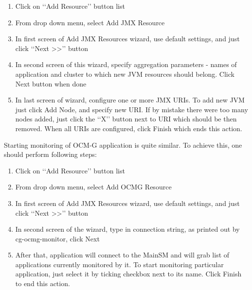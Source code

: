 \begin{enumerate}

\item Click on \lq\lq{}Add Resource\rq\rq{} button list 

\item From drop down menu, select Add JMX Resource

\item In first screen of Add JMX Resources wizard, use default settings, and just click \lq\lq{}Next >>\rq\rq{} button

\item In second screen of this wizard, specify aggregation parameters - names of application and cluster to which new JVM resources should belong. Click Next button when done

\item In last screen of wizard, configure one or more JMX URIs. To add new JVM just click Add Node, and specify new URI. If by mistake there were too many nodes added, just click the \lq\lq{}X\rq\rq{} button next to URI which should be then removed. When all URIs are configured, click Finish which ends this action.

\end{enumerate}

Starting monitoring of OCM-G application is quite similar. To achieve this, one should perform following steps:

\begin{enumerate}

\item Click on \lq\lq{}Add Resource\rq\rq{} button list 

\item From drop down menu, select Add OCMG Resource

\item In first screen of Add JMX Resources wizard, use default settings, and just click \lq\lq{}Next >>\rq\rq{} button

\item In second screen of the wizard, type in connection string, as printed out by cg-ocmg-monitor, click Next

\item After that, application will connect to the MainSM and will grab list of applications currently monitored by it. To start monitoring particular application, just select it by ticking checkbox next to its name. Click Finish to end this action.

\end{enumerate}

